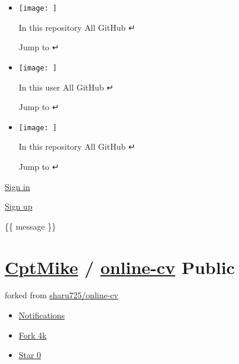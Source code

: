 \documentclass[
  english,
]{article}
\providecommand{\tightlist}{%
  \setlength{\itemsep}{0pt}\setlength{\parskip}{0pt}}
\begin{document}
\begin{itemize}
\tightlist
\item
  \href{}{}

  \texttt{[image: ]}

  { In this repository } { All GitHub } {↵}

  Jump to {↵}
\item
  \href{}{}

  \texttt{[image: ]}

  { In this user } { All GitHub } {↵}

  Jump to {↵}
\item
  \href{}{}

  \texttt{[image: ]}

  { In this repository } { All GitHub } {↵}

  Jump to {↵}
\end{itemize}

\href{/login?return_to=https\%3A\%2F\%2Fgithub.com\%2FCptMike\%2Fonline-cv}{Sign
in}

\href{/signup?ref_cta=Sign+up\&ref_loc=header+logged+out\&ref_page=\%2F\%3Cuser-name\%3E\%2F\%3Crepo-name\%3E\&source=header-repo\&source_repo=CptMike\%2Fonline-cv}{Sign
up}

\hypertarget{start-of-content}{}

\hypertarget{js-flash-container}{}
\{\{ message \}\}

\hypertarget{js-repo-pjax-container}{}
\hypertarget{repository-container-header}{}
\hypertarget{cptmike-online-cv-public}{%
\section[ { \href{/CptMike}{CptMike} } {/}
\textbf{\href{/CptMike/online-cv}{online-cv}}
{}{Public}]{\texorpdfstring{ { \href{/CptMike}{CptMike} } {/}
\textbf{\href{/CptMike/online-cv}{online-cv}}
{}{Public}}{  CptMike  / online-cv Public}}\label{cptmike-online-cv-public}}

{ forked from \href{/sharu725/online-cv}{sharu725/online-cv} }

\begin{itemize}
\item
  \href{/login?return_to=\%2FCptMike\%2Fonline-cv}{Notifications}
\item
  \href{/login?return_to=\%2FCptMike\%2Fonline-cv}{Fork
  \protect\hypertarget{repo-network-counter}{}{4k}}
\item
  \href{/login?return_to=\%2FCptMike\%2Fonline-cv}{{ Star }
  \protect\hypertarget{repo-stars-counter-star}{}{0}}
\end{itemize}
\end{document}
